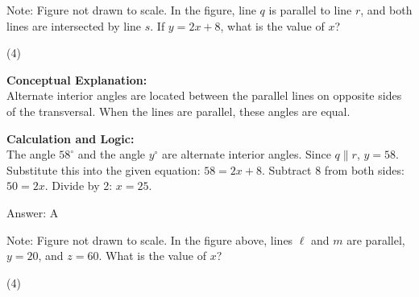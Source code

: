 \documentclass[11pt,paper=a4,answers]{exam}
\begin{document}
\begin{questions}
\question
\begin{center}
\end{center}
Note: Figure not drawn to scale. In the figure, line $q$ is parallel to line $r$, and both lines are intersected by line $s$. If $y = 2x + 8$, what is the value of $x$?
\begin{tasks}(4)
\end{tasks}

\begin{solution}
\textbf{Conceptual Explanation:} \\
Alternate interior angles are located between the parallel lines on opposite sides of the transversal. When the lines are parallel, these angles are equal.

\vspace{30pt}

\textbf{Calculation and Logic:} \\
The angle $58^\circ$ and the angle $y^\circ$ are alternate interior angles. Since $q \parallel r$, $y = 58$. Substitute this into the given equation: $58 = 2x + 8$. Subtract 8 from both sides: $50 = 2x$. Divide by 2: $x = 25$.

\vspace{30pt}

Answer: \colorbox{yellow!100}{A}
\end{solution}

\vspace{60pt}

\question
\begin{center}
\end{center}
Note: Figure not drawn to scale. In the figure above, lines $\ell$ and $m$ are parallel, $y = 20$, and $z = 60$. What is the value of $x$?
\begin{tasks}(4)
\end{tasks}


\end{questions}
\end{document}
